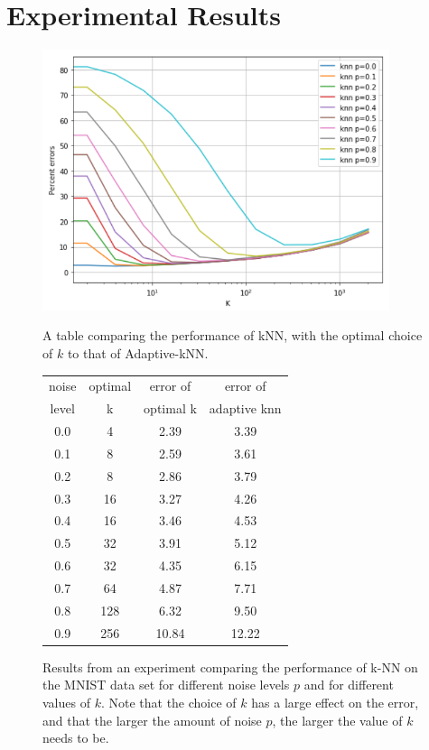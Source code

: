 \documentclass{article}
\begin{document}
\section{Experimental Results}

\begin{figure}
\begin{center}
\includegraphics[width=4in]{computing_NN-with_uniform_Noise_2.png}
\end{center}
\caption{Results from an experiment comparing the performance of k-NN on the MNIST data set for different noise levels $p$ and for different values of $k$. Note that the choice of $k$ has a large effect on the error, and that the larger the amount of noise $p$, the larger the value of $k$ needs to be.}
\label{fig:mnist}

A table comparing the performance of kNN, with the optimal choice of $k$ to that of Adaptive-kNN.

\begin{center}
 \begin{tabular}{||c | c | c | c||} 
 \hline
 noise & optimal & error of  & error of \\ 
 level &    k    & optimal k & adaptive knn \\  [0.5ex] 
 \hline\hline
 0.0 &    4 &  2.39 &  3.39 \\ \hline
 0.1 &    8 &  2.59 &  3.61 \\ \hline
 0.2 &    8 &  2.86 &  3.79 \\ \hline
 0.3 &   16 &  3.27 &  4.26 \\ \hline
 0.4 &   16 &  3.46 &  4.53 \\ \hline
 0.5 &   32 &  3.91 &  5.12 \\ \hline
 0.6 &   32 &  4.35 &  6.15 \\ \hline
 0.7 &   64 &  4.87 &  7.71 \\ \hline
 0.8 &  128 &  6.32 &  9.50 \\ \hline
 0.9 &  256 & 10.84 & 12.22 \\ \hline
 \hline
\end{tabular}
\end{center}

\end{figure}
\end{document}
